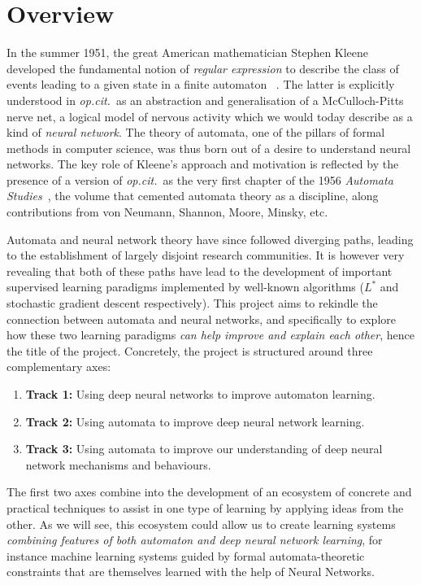 \documentclass[11pt,a4paper]{article}
\newcommand{\Ls}{$L^\ast$\xspace}
\begin{document}
	
	
	\section*{Overview}
	
		In the summer 1951, the great American mathematician Stephen Kleene developed the fundamental notion of \emph{regular expression} to describe the class of events leading to a given state in a finite automaton ~\cite[Theorem 6]{kleene1951}. The latter is explicitly understood in \textit{op.cit.}\ as an abstraction and generalisation of a McCulloch-Pitts nerve net, a logical model of nervous activity which we would today describe as a kind of \emph{neural network}. The theory of automata, one of the pillars of formal methods in computer science, was thus born out of a desire to understand neural networks. The key role of Kleene's approach and motivation is reflected by the presence of a version of \textit{op.cit.}\ as the very first chapter of the 1956 \textit{Automata Studies}~\cite{ashby1956automata}, the volume that cemented automata theory as a discipline, along contributions from von Neumann, Shannon, Moore, Minsky, etc. 
		
		Automata and neural network theory have since followed diverging paths, leading to the establishment of largely disjoint research communities. It is however very revealing that both of these paths have lead to the development of important supervised learning paradigms implemented by well-known algorithms (\Ls and stochastic gradient descent respectively). 		
		This project aims to rekindle the connection between automata and neural networks, and specifically to explore how these two learning paradigms \emph{can help improve and explain each other}, hence the title of the project.
		Concretely, the project is structured around  three complementary axes:
		\begin{enumerate}
			\item \textbf{Track 1:} Using deep neural networks to improve automaton learning.
			\item \textbf{Track 2:} Using automata to improve deep neural network learning.
			\item \textbf{Track 3:} Using automata to improve our understanding of deep neural network mechanisms and behaviours.
		\end{enumerate}
		The first two axes combine into the development of an ecosystem of concrete and practical techniques to assist in one type of learning by applying ideas from the other. 
		As we will see, this ecosystem could allow us to create learning systems \emph{combining features of both automaton and deep neural network learning}, for instance machine learning systems guided by formal automata-theoretic constraints that are themselves learned with the help of Neural Networks. 
	
\end{document}
